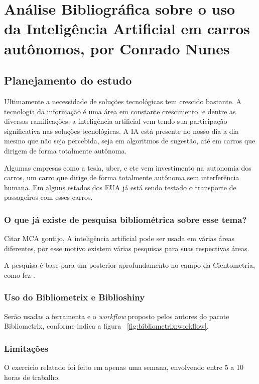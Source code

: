 \chapter{Análise Bibliográfica sobre o uso da Inteligência Artificial em carros autônomos, por Conrado Nunes\label{chap:bibliometria:Conras21}}

\section{Planejamento do estudo}

Ultimamente a necessidade de soluções tecnológicas tem crescido bastante. A tecnologia da informação é uma área em constante crescimento, e dentre as diversas ramificações, a inteligência artificial vem tendo sua participação significativa nas soluções tecnológicas. A IA está presente no nosso dia a dia mesmo que não seja percebida, seja em algoritmos de sugestão, até em carros que dirigem de forma totalmente autônoma.

Algumas empresas como a tesla, uber, e etc vem investimento na autonomia dos carros, um carro que dirige de forma totalmente autônoma sem interferência humana. Em alguns estados dos EUA já está sendo testado o transporte de passageiros com esses carros.

\subsection{O que já existe de pesquisa bibliométrica sobre esse tema?}

Citar MCA gontijo, A inteligência artificial pode ser usada em várias áreas diferentes, por esse motivo existem várias pesquisas para suas respectivas áreas.

A pesquisa é base para um posterior aprofundamento no campo da Cientometria, como fez \cite{chavalarias_whats_2017}.

\subsection{Uso do Bibliometrix e Biblioshiny}
Serão usadas a ferramenta e o \textit{workflow} proposto pelos autores do pacote Bibliometrix, conforme indica a figura ~\ref{fig:bibliometrix:workflow}.

\subsection{Limitações} O exercício relatado foi feito em apenas uma semana, envolvendo entre 5 a 10 horas de trabalho.


